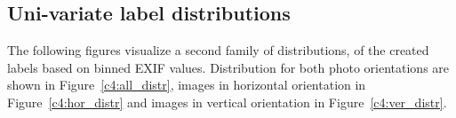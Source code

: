 
\subsection{Uni-variate label distributions}
\label{c4:distributions}

The following figures visualize a second family of distributions, of the created labels based on binned EXIF values. Distribution for both photo orientations are shown in Figure~\ref{c4:all_distr}, images in horizontal orientation in Figure~\ref{c4:hor_distr} and images in vertical orientation in Figure~\ref{c4:ver_distr}.

\begin{figure}[ht!]
    \centering  

\end{figure}
